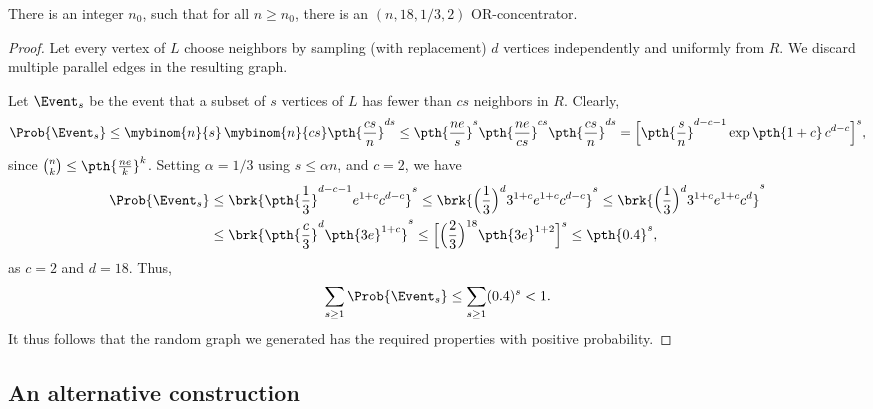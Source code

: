 \begin{theorem}
    There is an integer $n_0$, such that for all $n \geq n_0$, there
    is an $(n,18, 1/3, 2)$ OR-concentrator.
\end{theorem}
\begin{proof}
    Let every vertex of $L$ choose neighbors by sampling (with
    replacement) $d$ vertices independently and uniformly from $R$.
    We discard multiple parallel edges in the resulting graph.
    
    Let $\Event_s$ be the event that a subset of $s$ vertices of $L$
    has fewer than $cs$ neighbors in $R$. Clearly,
    \begin{equation*}
        \Prob{\bigl.\Event_s}%
        \leq%
        \mybinom{n}{s} \, \mybinom{n}{cs} \pth{ \frac{cs}{n}}^{ds}%
        \leq%
        \pth{\frac{ne}{s}}^s \pth{\frac{ne}{cs}}^{cs} \pth{
           \frac{cs}{n}}^{ds}%
        =%
        \Bigl[ \pth{\frac{s}{n}}^{d-c-1} \exp\pth{\bigl. 1+c}\,
        c^{d-c} \Bigr]^s,
    \end{equation*}
    since $\binom{n}{k} \leq \pth{\frac{ne}{k}}^k$. Setting
    $\alpha = 1/3$ using $s\leq \alpha n$, and $c=2$, we have
    \begin{align*}
      \Prob{\bigl. \Event_s}%
      &\leq%
        \brk{ \Bigl. \smash{ \pth{\Bigl.\smash{\frac{1}{3}}}^{d-c-1} e^{1+c} c^{d-c} }}^s%
        \leq %
        \brk{ \Bigl. \smash{\Bigl(\frac{1}{3} \Bigr)^{d}}3^{1+c} e^{1+c} c^{d-c}}^s%
        \leq %
        \brk{ \Bigl( \frac{1}{3} \Bigr)^{d}3^{1+c}
        e^{1+c} c^{d}}^s  \\
      &\leq%
        \brk{ \pth{\frac{c}{3}}^{d}\pth{3e}^{1+c} }^s%
        \leq%
        \Bigl[ \Bigl(\frac{2}{3} \Bigr)^{18}\pth{3e}^{1+2} \Bigr]^s%
        \leq%
        \pth{\bigl.0.4}^s,
    \end{align*}
    as $c=2$ and $d=18$. Thus,
    \begin{align*}
      \sum_{s \geq 1} \Prob{ \bigl. \Event_s}%
      \leq%
      \sum_{s\geq 1} (0.4)^s%
      <%
      1.
    \end{align*}
    It thus follows that the random graph we generated has the
    required properties with positive probability.
\end{proof}


\subsection{An alternative construction}


